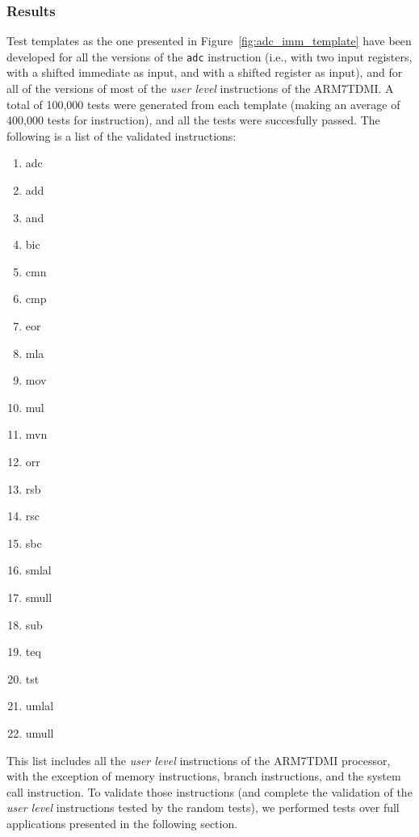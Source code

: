 \subsubsection{Results}

Test templates as the one presented in Figure~\ref{fig:adc_imm_template} have been developed for all the versions of the \texttt{adc} instruction (i.e., with two input registers, with a shifted immediate as input, and with a shifted register as input), and for all of the versions of most of the \textit{user level} instructions of the ARM7TDMI.
A total of 100,000 tests were generated from each template (making an average of 400,000 tests for instruction), and all the tests were succesfully passed. The following is a list of the validated instructions:
\begin{enumerate}
	\item adc
	\item add
	\item and
	\item bic
	\item cmn
	\item cmp
	\item eor
	\item mla
	\item mov
	\item mul
	\item mvn
	\item orr
	\item rsb
	\item rsc
	\item sbc
	\item smlal
	\item smull
	\item sub
	\item teq
	\item tst
	\item umlal
	\item umull
\end{enumerate}

This list includes all the \textit{user level} instructions of the ARM7TDMI processor, with the exception of memory instructions, branch instructions, and the system call instruction.
To validate those instructions (and complete the validation of the \textit{user level} instructions tested by the random tests), we performed tests over full applications presented in the following section.
